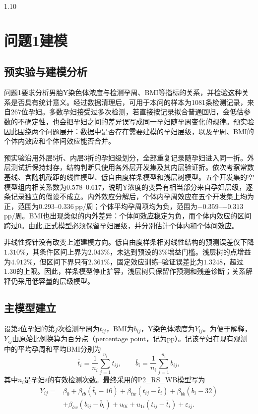 \documentclass[12pt,a4paper]{ctexrep}
\numberwithin{equation}{section}
\newcommand{\hei}{\heiti}
\begin{document}
\begin{spacing}{1.10}
{		%
			\section{问题1建模}
			\label{sec:q1-model}
			\subsection{预实验与建模分析}
			\label{subsec:q1-pilot}

			问题1要求分析男胎Y染色体浓度与检测孕周、BMI等指标的关系，并检验这种关系是否具有统计意义。经过数据清理后，可用于本问的样本为1081条检测记录，来自267位孕妇。多数孕妇接受过多次检测，若直接按记录拟合普通回归，会低估参数的不确定性，也会把孕妇之间的差异误写成同一孕妇随孕周变化的规律。预实验因此围绕两个问题展开：{\hei 数据中是否存在需要建模的孕妇层级，以及孕周、BMI的个体内效应和个体间效应能否合并}。

			预实验沿用外层5折、内层3折的孕妇级划分，全部重复记录随孕妇进入同一折。外层测试折保持封存，结构判断只使用各外层开发集及其内层验证折。依次考察常数基线、含随机截距的线性模型、低自由度样条模型和浅层树模型。五个开发集的空模型组内相关系数为$0.578$--$0.617$，说明Y浓度的变异有相当部分来自孕妇层级，{\hei 逐条记录独立的假设不成立}。内外效应分解后，个体内孕周效应在五个开发集上均为正，范围为$0.293$--$0.336$\,pp/周；个体平均孕周项均为负，范围为$-0.359$--$-0.313$\,pp/周。BMI也出现类似的内外差异：个体间效应稳定为负，而个体内效应的区间跨过0。由此,{\hei 正式模型必须保留孕妇层级，并分别估计个体内和个体间效应}。

			非线性探针没有改变上述建模方向。低自由度样条相对线性结构的预测误差仅下降$1.310\%$，其条件区间上界为$2.043\%$，未达到预设的$3\%$增益门槛。浅层树的点增益为$4.912\%$，但区间下界只有$2.361\%$，固定效应训练--验证误差比为$1.3248$，超过$1.30$的上限。因此，样条模型停止扩容，浅层树只保留作预测和残差诊断；关系解释仍采用低容量的层级模型。

			\subsection{主模型建立}
			\label{subsec:q1-model-establishment}

			设第$i$位孕妇的第$j$次检测孕周为$t_{ij}$，BMI为$b_{ij}$，Y染色体浓度为$Y_{ij}$。为便于解释，$Y_{ij}$由原始比例换算为百分点（percentage point，记为pp）。记该孕妇在现有观测中的平均孕周和平均BMI分别为
			\begin{equation}
				\bar t_i=\frac{1}{n_i}\sum_{j=1}^{n_i}t_{ij},\qquad
				\bar b_i=\frac{1}{n_i}\sum_{j=1}^{n_i}b_{ij},
				\label{eq:q1-person-means}
			\end{equation}
			其中$n_i$是孕妇$i$的有效检测次数。最终采用的P2\_RS\_WB模型写为
			\begin{equation}
			\begin{aligned}
			Y_{ij}={}&\beta_0+\beta_{tb}(\bar t_i-16)
			+\beta_{tw}(t_{ij}-\bar t_i)
			+\beta_{bb}(\bar b_i-32) \\
			&+\beta_{bw}(b_{ij}-\bar b_i)
			+u_{0i}+u_{1i}(t_{ij}-\bar t_i)+\varepsilon_{ij}.
			\end{aligned}
			\label{eq:q1-main-model}
			\end{equation}

}
\end{spacing}
\end{document}
